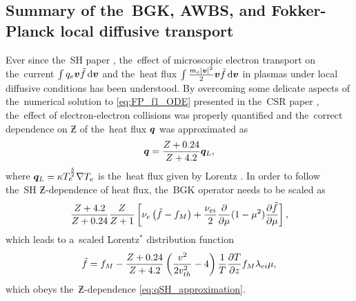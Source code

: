 
\subsection{Summary of the~BGK, AWBS, and Fokker-Planck local diffusive 
transport}
\label{sec:SummaryDiffusiveKinetics}

Ever since the~SH paper \cite{SpitzerHarm_PR1953}, the~effect of microscopic
electron transport on the~current $\int q_e \boldsymbol{v} \tilde{f} \, \text{d}\boldsymbol{v}$ 
and the~heat flux $\int \frac{m_e |\boldsymbol{v}|^2}{2} \boldsymbol{v} \tilde{f} \, \text{d}\boldsymbol{v}$ 
in plasmas
under local diffusive conditions has been understood. By overcoming some 
delicate aspects of the~numerical solution to \eqref{eq:FP_f1_ODE} presented 
in the~CSR paper \cite{CSR_1950}, the~effect of electron-electron collisions
was properly quantified and the~correct dependence on $\Zbar$ of the~heat flux
$\boldsymbol{q}$ was approximated as 
\begin{equation}
  \boldsymbol{q} = \frac{Z + 0.24}{Z + 4.2} \boldsymbol{q}_L ,
  \label{eq:qSH_approximation}
\end{equation}
where $\boldsymbol{q}_L = \kappa T_e^{\frac{5}{2}}\nabla T_e$ is the~heat flux given 
by Lorentz \cite{Lorentz_1905}.
In order to follow the~SH $\Zbar$-dependence of heat flux, the~BGK operator 
needs to be scaled as
\begin{equation}
  \frac{Z + 4.2}{Z + 0.24}
  \frac{Z}{Z+1}\left[\nu_{e}\left(\tilde{f} - f_M\right)
  + \frac{\nu_{ei}}{2}
  \frac{\partial{}}{\partial{\mu}}(1 - \mu^2)\frac{\partial{\tilde{f}}}{\partial{\mu}}\right] ,
  \nonumber
\end{equation}
which leads to a~scaled Lorentz$^*$ distribution function
\begin{equation}
  \tilde{f} = f_M - \frac{Z+0.24}{Z+4.2}
  \left( \frac{v^2}{2 v_{th}^2} - 4\right)
  \frac{1}{T}\frac{\partial{T}}{\partial{z}}f_M \lambda_{ei} \mu ,
  \label{eq:Scaled_Lorentz}
\end{equation}
which obeys the~$\Zbar$-dependence \eqref{eq:qSH_approximation}.

